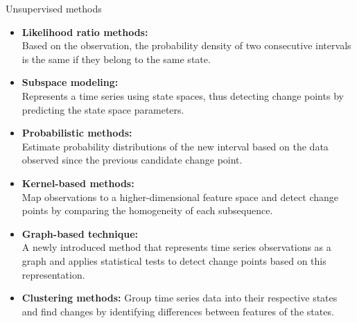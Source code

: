 \documentclass{beamer}
\begin{document}
\begin{frame}[allowframebreaks]{Unsupervised methods}
    \begin{itemize}
        \item \textbf{Likelihood ratio methods:} \\ 
        Based on the observation, the probability density of two consecutive intervals is the same if they belong to the same state. 
        \bigskip
        
        \item \textbf{Subspace modeling:} \\
        Represents a time series using state spaces, thus detecting change points by predicting the state space parameters. 
        \bigskip
        \item \textbf{Probabilistic methods:} \\ 
        Estimate probability distributions of the new interval based on the data observed since the previous candidate change point. 
        \bigskip \framebreak
        
        \item \textbf{Kernel-based methods:} \\
        Map observations to a higher-dimensional feature space and detect change points by comparing the homogeneity of each subsequence. 
        \bigskip
        
        \item \textbf{Graph-based technique:} \\
        A newly introduced method that represents time series observations as a graph and applies statistical tests to detect change points based on this representation. 
        \bigskip
        
        \item \textbf{Clustering methods:} 
        Group time series data into their respective states and find changes by identifying differences between features of the states.
    \end{itemize}
\end{frame}
\end{document}
